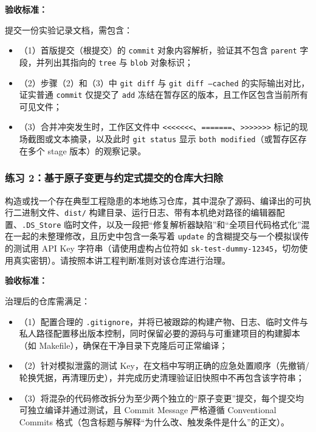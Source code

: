 \documentclass[UTF8,a4paper,11pt,fontset=fandol]{ctexart}
\begin{document}
\par{}\textbf{验收标准：}

提交一份实验记录文档，需包含：

\begin{itemize}
\item （1）首版提交（根提交）的 \texttt{commit} 对象内容解析，验证其不包含 \texttt{parent} 字段，并列出其指向的 \texttt{tree} 与 \texttt{blob} 对象标识；

\item （2）步骤（2）和（3）中 \texttt{git diff} 与 \texttt{git diff --cached} 的实际输出对比，证实普通 \texttt{commit} 仅提交了 \texttt{add} 冻结在暂存区的版本，且工作区包含当前所有可见文件；

\item （3）合并冲突发生时，工作区文件中 \texttt{<<<<<<<}、\texttt{=======}、\texttt{>>>>>>>} 标记的现场截图或文本摘录，以及此时 \texttt{git status} 显示 \texttt{both modified}（或暂存区存在多个 stage 版本）的观察记录。
\end{itemize}

\subsubsection*{练习 2：基于原子变更与约定式提交的仓库大扫除}

构造或找一个存在典型工程隐患的本地练习仓库，其中混杂了源码、编译出的可执行二进制文件、\texttt{dist/} 构建目录、运行日志、带有本机绝对路径的编辑器配置、\texttt{.DS\_Store} 临时文件，以及一段把“修复解析器缺陷”和“全项目代码格式化”混在一起的未整理修改，且历史中包含一条写着 \texttt{update} 的含糊提交与一个模拟误传的测试用 API Key 字符串（请使用虚构占位符如 \texttt{sk-test-dummy-12345}，切勿使用真实密钥）。请按照本讲工程判断准则对该仓库进行治理。

\par{}\textbf{验收标准：}

治理后的仓库需满足：

\begin{itemize}
\item （1）配置合理的 \texttt{.gitignore}，并将已被跟踪的构建产物、日志、临时文件与私人路径配置移出版本控制，同时保留必要的源码与可重建项目的构建脚本（如 Makefile），确保在干净目录下克隆后可正常编译；

\item （2）针对模拟泄露的测试 Key，在文档中写明正确的应急处置顺序（先撤销/轮换凭据，再清理历史），并完成历史清理验证旧快照中不再包含该字符串；

\item （3）将混杂的代码修改拆分为至少两个独立的“原子变更”提交，每个提交均可独立编译并通过测试，且 Commit Message 严格遵循 Conventional Commits 格式（包含标题与解释“为什么改、触发条件是什么”的正文）。
\end{itemize}
\end{document}
